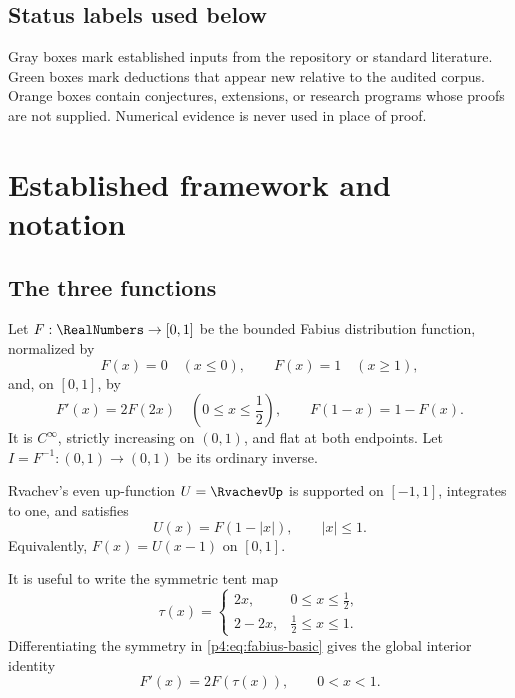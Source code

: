 \documentclass[11pt]{article}
\numberwithin{equation}{section}
\theoremstyle{definition}
\theoremstyle{remark}
\begin{document}
\subsection{Status labels used below}
Gray boxes mark established inputs from the repository or standard literature.  Green boxes mark deductions that appear new relative to the audited corpus.  Orange boxes contain conjectures, extensions, or research programs whose proofs are not supplied.  Numerical evidence is never used in place of proof.

\section{Established framework and notation}
\label{p4:sec:framework}

\subsection{The three functions}
Let $F:\RealNumbers\to[0,1]$ be the bounded Fabius distribution function, normalized by
\[
 F(x)=0\quad(x\le0),\qquad F(x)=1\quad(x\ge1),
\]
and, on $[0,1]$, by
\begin{equation}
 F'(x)=2F(2x)\quad\left(0\le x\le\frac12\right),
 \qquad F(1-x)=1-F(x).
 \label{p4:eq:fabius-basic}
\end{equation}
It is $C^\infty$, strictly increasing on $(0,1)$, and flat at both endpoints.  Let $I=F^{-1}:(0,1)\to(0,1)$ be its ordinary inverse.

Rvachev's even up-function $U=\RvachevUp$ is supported on $[-1,1]$, integrates to one, and satisfies~\cite{p4:ariasUp,p4:ariasArithmetic}
\begin{equation}
 U(x)=F(1-|x|),\qquad |x|\le1.
 \label{p4:eq:up-fabius}
\end{equation}
Equivalently, $F(x)=U(x-1)$ on $[0,1]$.

It is useful to write the symmetric tent map
\begin{equation}
 \tau(x)=
 \begin{cases}
  2x,&0\le x\le\frac12,\\
  2-2x,&\frac12\le x\le1.
 \end{cases}
 \label{p4:eq:tent}
\end{equation}
Differentiating the symmetry in \eqref{p4:eq:fabius-basic} gives the global interior identity
\begin{equation}
 F'(x)=2F(\tau(x)),\qquad 0<x<1.
 \label{p4:eq:tent-derivative}
\end{equation}
\end{document}
